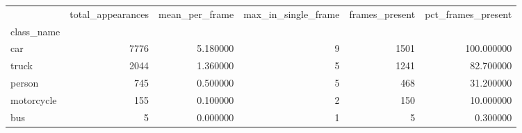 \begin{tabular}{lrrrrr}
\toprule
 & total_appearances & mean_per_frame & max_in_single_frame & frames_present & pct_frames_present \\
class_name &  &  &  &  &  \\
\midrule
car & 7776 & 5.180000 & 9 & 1501 & 100.000000 \\
truck & 2044 & 1.360000 & 5 & 1241 & 82.700000 \\
person & 745 & 0.500000 & 5 & 468 & 31.200000 \\
motorcycle & 155 & 0.100000 & 2 & 150 & 10.000000 \\
bus & 5 & 0.000000 & 1 & 5 & 0.300000 \\
\bottomrule
\end{tabular}
